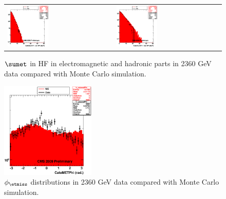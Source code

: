 \begin{figure}[h!]
 \centering
 \begin{tabular}{ll}
  \includegraphics[width=0.40\textwidth]{plots_DataVsMC_MB_2360GeV/h_caloSumetEmHF.eps} &
  \includegraphics[width=0.40\textwidth]{plots_DataVsMC_MB_2360GeV/h_caloSumetHadHF.eps} \\
 \end{tabular}
 \caption{$\sumet$ in HF in electromagnetic and hadronic parts in 2360 GeV data compared
   with Monte Carlo simulation.
          \label{fig:DataVsMC_MB_2360_6}}

\end{figure}
\begin{figure}[h!]
 \centering
  \includegraphics[width=0.40\textwidth]{plots_DataVsMC_MB_2360GeV/h_calometPhi.eps}
 \caption{$\phi_{\etmiss}$ distributions in 2360 GeV data compared
   with Monte Carlo simulation.
          \label{fig:DataVsMC_MB_2360_7}}
\end{figure}


